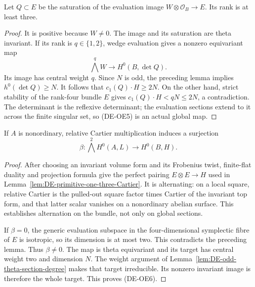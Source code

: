 \begin{lemma}
\label{lem:DE-odd-Cartier-evaluation-three}
Let \(Q\subset E\) be the saturation of the evaluation image
\(W\otimes\mathcal O_B\to E\). Its rank is at least three.
\end{lemma}
\begin{proof}
It is positive because \(W\ne0\). The image and its saturation
are theta invariant. If its rank is \(q\in\{1,2\}\), wedge
evaluation gives a nonzero equivariant map
\[
          \bigwedge^q W\longrightarrow H^0(B,\det Q).
 \tag{DE-OE5}
\]
Its image has central weight \(q\). Since \(N\) is odd,
the preceding lemma implies \(h^0(\det Q)\ge N\).
It follows that \(c_1(Q)\cdot H\ge2N\).
On the other hand, strict stability of the rank-four bundle
\(E\) gives \(c_1(Q)\cdot H<qN\le2N\), a contradiction.
The determinant is the reflexive determinant; the evaluation
sections extend to it across the finite singular set, so (DE-OE5)
is an actual global map.
\end{proof}

\begin{theorem}
\label{thm:DE-odd-polarization-Cartier-surjection}
If \(A\) is nonordinary, relative Cartier multiplication induces
a surjection
\[
 \beta:\bigwedge^2 H^0(A,L)\longrightarrow H^0(B,H).
 \tag{DE-OE6}
\]
\end{theorem}
\begin{proof}
After choosing an invariant volume form and its Frobenius twist,
finite-flat duality and projection formula give the perfect
pairing \(E\otimes E\to H\) used in
Lemma~\ref{lem:DE-primitive-one-three-Cartier}.
It is alternating: on a local square, relative Cartier is
the pulled-out square factor times Cartier of the invariant
top form, and that latter scalar vanishes on a nonordinary
abelian surface. This establishes alternation on the bundle,
not only on global sections.

If \(\beta=0\), the generic evaluation subspace in the
four-dimensional symplectic fibre of \(E\) is isotropic,
so its dimension is at most two. This contradicts the preceding
lemma. Thus \(\beta\ne0\). The map is theta equivariant
and its target has central weight two and dimension \(N\).
The weight argument of Lemma~\ref{lem:DE-odd-theta-section-degree}
makes that target irreducible. Its nonzero invariant image is
therefore the whole target. This proves (DE-OE6).
\end{proof}

